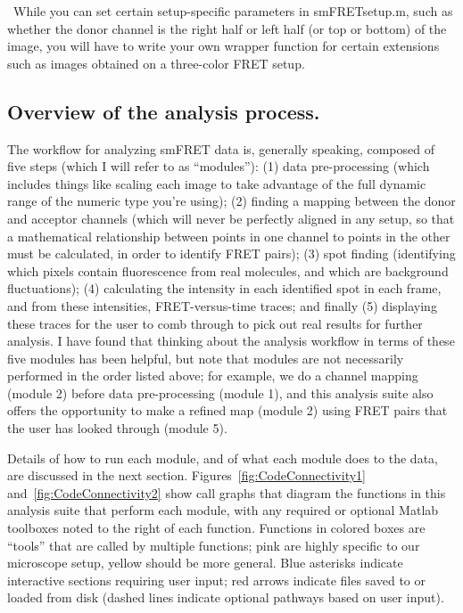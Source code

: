 \documentclass[11pt]{article}
\begin{document}
\noindent \textbullet~While you can set certain setup-specific parameters in smFRETsetup.m, such as whether the donor channel is the right half or left half (or top or bottom) of the image, you will have to write your own wrapper function for certain extensions such as images obtained on a three-color FRET setup.

\subsection{Overview of the analysis process.}

The workflow for analyzing smFRET data is, generally speaking, composed of five steps (which I will refer to as ``modules''): (1) data pre-processing (which includes things like scaling each image to take advantage of the full dynamic range of the numeric type you're using); (2) finding a mapping between the donor and acceptor channels (which will never be perfectly aligned in any setup, so that a mathematical relationship between points in one channel to points in the other must be calculated, in order to identify FRET pairs); (3) spot finding (identifying which pixels contain fluorescence from real molecules, and which are background fluctuations); (4) calculating the intensity in each identified spot in each frame, and from these intensities, FRET-versus-time traces; and finally (5) displaying these traces for the user to comb through to pick out real results for further analysis.  I have found that thinking about the analysis workflow in terms of these five modules has been helpful, but note that modules are not necessarily performed in the order listed above; for example, we do a channel mapping (module 2) before data pre-processing (module 1), and this analysis suite also offers the opportunity to make a refined map (module 2) using FRET pairs that the user has looked through (module 5).

Details of how to run each module, and of what each module does to the data, are discussed in the next section.  Figures~\ref{fig:CodeConnectivity1} and~\ref{fig:CodeConnectivity2} show call graphs that diagram the functions in this analysis suite that perform each module, with any required or optional Matlab toolboxes noted to the right of each function. Functions in colored boxes are ``tools'' that are called by multiple functions; pink are highly specific to our microscope setup, yellow should be more general.  Blue asterisks indicate interactive sections requiring user input; red arrows indicate files saved to or loaded from disk (dashed lines indicate optional pathways based on user input).
\end{document}
